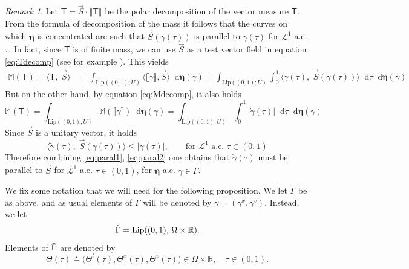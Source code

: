\documentclass[11pt, twoside, reqno]{amsart}
\theoremstyle{definition}
\theoremstyle{remark}
\newtheorem{remark}[thm]{Remark}
\numberwithin{equation}{section}
\newcommand*\dif{\mathop{}\!\mathrm{d}}
\newcommand{\mc}[1]{\mathcal{#1}}
\newcommand{\bs}[1]{\boldsymbol{#1}}
\newcommand{\ms}[1]{\mathsf{#1}}
\newcommand{\msc}[1]{\mathscr{#1}}
\begin{document}
\begin{remark}\label{eq:intcurv}
    Let $\ms T = \vec S \cdot \left\Vert \ms T\right\Vert$ be the polar decomposition of the vector measure $\ms T$. From the formula of decomposition of the mass it follows that the curves on which $\boldsymbol{\eta}$ is concentrated are such that $\vec S(\gamma(\tau))$ is parallel to $\dot \gamma(\tau)$ for $\msc L^1$ a.e. $\tau$. In fact, since $\ms T$ is of finite mass, we can use $\vec S$ as a test vector field in equation \eqref{eq:Tdecomp} (see for example \cite{KP_book}). This yields
    \begin{equation}\label{eq:paral1}
    \begin{aligned}
     \mathbb M(\ms T)  = \langle \ms T, \; \vec S \rangle & = \int_{\mathrm{Lip}((0,1)  ; U)} \langle \llbracket\gamma\rrbracket, \vec S \rangle \dif \boldsymbol{\eta} (\gamma) = \int_{\mathrm{Lip}((0,1)  ; U)} \int_0^1 \langle \dot \gamma(\tau), \; \vec S(\gamma(\tau)) \rangle \dif \tau \dif \boldsymbol{\eta} (\gamma)
    \end{aligned}
    \end{equation}
    But on the other hand, by equation \eqref{eq:Mdecomp}, it also holds
    \begin{equation}\label{eq:paral2}
    \mathbb M(\ms T) = \int_{\mathrm{Lip}((0,1)  ; U)}  \mathbb M (\llbracket\gamma\rrbracket) \dif \boldsymbol{\eta} (\gamma) = \int_{\mathrm{Lip}((0,1)  ; U)} \int_0^1 |\dot \gamma(\tau)| \dif \tau \dif \boldsymbol{\eta} (\gamma)
    \end{equation}
   Since $\vec S$ is a unitary vector, it holds
   $$
   \langle \dot \gamma(\tau), \; \vec S(\gamma(\tau)) \rangle \leq |\dot \gamma(\tau)| , \qquad \text{for $\msc L^1$ a.e. $\tau \in (0, 1)$}
   $$
    Therefore combining \eqref{eq:paral1}, \eqref{eq:paral2} one obtains that $\dot{\gamma}(\tau)$ must be parallel to $\vec S$ for $\mc L^1$ a.e. $\tau \in (0,1)$, for $\bs \eta$ a.e. $\gamma \in \Gamma$.
\end{remark}



We fix some notation that we will need for the following proposition. We let $\Gamma$ be as above, and as usual elements of $\Gamma$ will be denoted by $\gamma = (\gamma^x, \gamma^v)$. Instead, we let $$\Tilde{\Gamma} = \mathrm{Lip}((0,1),\, \Omega \times \mathbb R).$$ Elements of $\Tilde{\Gamma}$ are denoted by $$\Theta(\tau) \doteq \big(\Theta^t(\tau), \Theta^x(\tau), \Theta^v(\tau)\big) \in \Omega \times \mathbb R, \quad\tau \in (0, 1).$$
\end{document}
